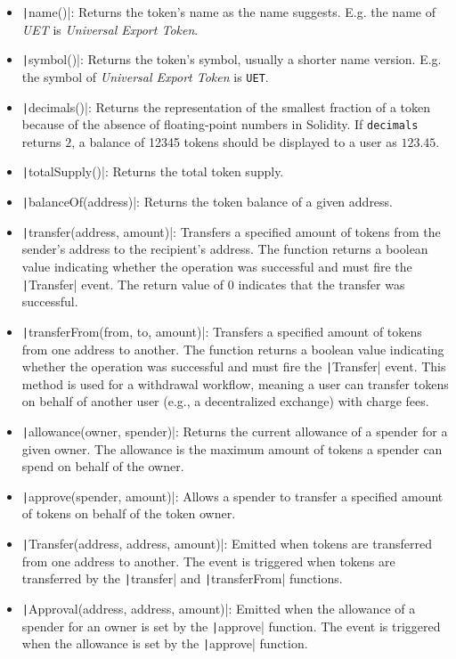 \begin{itemize}
    \item \texttt|name()|: Returns the token's name as the name suggests. E.g. the name of \textit{UET} is \textit{Universal Export Token}.
    \item \texttt|symbol()|: Returns the token's symbol, usually a shorter name version. E.g. the symbol of \textit{Universal Export Token} is \texttt{UET}.
    \item \texttt|decimals()|: Returns the representation of the smallest fraction of a token because of the absence of floating-point numbers in Solidity. If \texttt{decimals} returns $2$, 
    a balance of 12345 tokens should be displayed to a user as $123.45$.
    \item \texttt|totalSupply()|: Returns the total token supply.
    \item \texttt|balanceOf(address)|: Returns the token balance of a given address.
    \item \texttt|transfer(address, amount)|: Transfers a specified amount of tokens from the sender's address to the recipient's address. The function returns a boolean
          value indicating whether the operation was successful and must fire the \texttt|Transfer| event. The return value of 0 indicates that the transfer was successful.
    \item \texttt|transferFrom(from, to, amount)|: Transfers a specified amount of tokens from one address to another. The function returns a boolean value
          indicating whether the operation was successful and must fire the \texttt|Transfer| event. This method is used for a withdrawal workflow,
          meaning a user can transfer tokens on behalf of another user (e.g., a decentralized exchange) with charge fees.
    \item \texttt|allowance(owner, spender)|: Returns the current allowance of a spender for a given owner. The allowance is the maximum amount of tokens a spender can spend on behalf of the owner.
    \item \texttt|approve(spender, amount)|: Allows a spender to transfer a specified amount of tokens on behalf of the token owner.
    \item \texttt|Transfer(address, address, amount)|: Emitted when tokens are transferred from one address to another. The event is triggered when tokens are transferred by the \texttt|transfer| and \texttt|transferFrom| functions.
    \item \texttt|Approval(address, address, amount)|: Emitted when the allowance of a spender for an owner is set by the \texttt|approve| function. The event is triggered when the allowance is set by the \texttt|approve| function.
\end{itemize}

